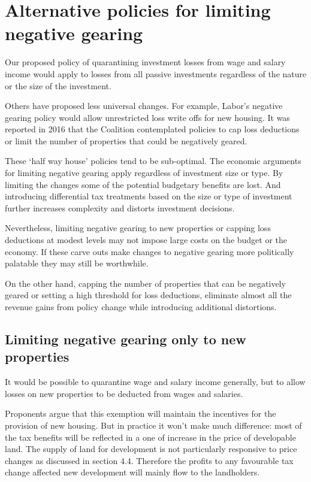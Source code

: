 \documentclass{grattan}\usepackage[]{graphicx}\usepackage[]{color}
\begin{document}
\section{Alternative policies for limiting negative gearing}
Our proposed policy of quarantining investment losses from wage and salary income would apply to losses from all passive investments regardless of the nature or the size of the investment. 

Others have proposed less universal changes. For example, Labor's negative gearing policy would allow unrestricted loss write offs for new housing.  It was reported in 2016 that the Coalition contemplated policies to cap loss deductions or limit the number of properties that could be negatively geared. 

These `half way house' policies tend to be sub-optimal. The economic arguments for limiting negative gearing apply regardless of investment size or type. By limiting the changes some of the potential budgetary benefits are lost. And introducing differential tax treatments based on the size or type of investment further increases complexity and distorts investment decisions. 

Nevertheless, limiting negative gearing to new properties or capping loss deductions at modest levels may not impose large costs on the budget or the economy. If these carve outs make changes to negative gearing more politically palatable they may still be worthwhile.

On the other hand, capping the number of properties that can be negatively geared or setting a high threshold for loss deductions, eliminate almost all the revenue gains from policy change while introducing additional distortions. 

\subsection{Limiting negative gearing only to new properties}
It would be possible to quarantine wage and salary income generally, but to allow losses on new properties to be deducted from wages and salaries. 

Proponents argue that this exemption will maintain the incentives for the provision of new housing.  But in practice it won't make much difference: most of the tax benefits will be reflected in a one of increase in the price of developable land. The supply of land for development is not particularly responsive to price changes as discussed in section 4.4. Therefore the profits to any favourable tax change affected new development will mainly flow to the landholders. 
\end{document}
